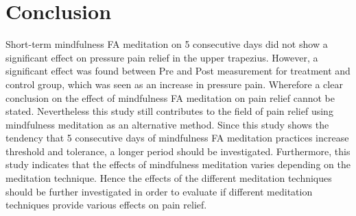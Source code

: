 \section{Conclusion}
Short-term mindfulness FA meditation on 5 consecutive days did not show a significant effect on pressure pain relief in the upper trapezius. However, a significant effect was found between Pre and Post measurement for treatment and control group, which was seen as an increase in pressure pain.
Wherefore a clear conclusion on the effect of mindfulness FA meditation on pain relief cannot be stated. Nevertheless this study still contributes to the field of pain relief using mindfulness meditation as an alternative method. Since this study shows the tendency that 5 consecutive days of mindfulness FA meditation practices increase threshold and tolerance, a longer period should be investigated. Furthermore, this study indicates that the effects of mindfulness meditation varies depending on the meditation technique. Hence the effects of the different meditation techniques should be further investigated in order to evaluate if different meditation techniques provide various effects on pain relief. 